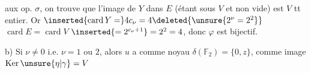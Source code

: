 aux op. $\sigma$, on trouve que l'image de $Y$ dans $E$  (étant  sous $V$ et non vide) est $V$ tt entier. Or $\inserted{\operatorname{card}Y=}4c_\nu=4\deleted{\unsure{2^\nu=2^2}}$ \deleted{\unsure{=}} $\operatorname{card}E=\operatorname{card}V$  $\inserted{=2^{c_\nu+1}}=2^2=4$, donc  $\varphi$ est bijectif.

b) Si $\nu\ne0$ i.e. $\nu=1$ ou $2$, alors  $u$ a comme noyau  $\delta(\mathbb F_2)=\{0,z\}$, comme image $\operatorname{Ker}\unsure{\eta|\gamma}=V$ 
